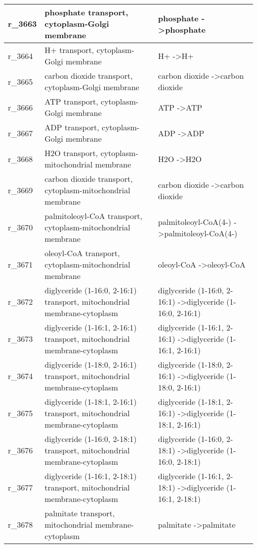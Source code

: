 \begin{landscape}
{\begin{longtable}{|l|p{7cm}|p{15cm}|}
r\_3663 & phosphate transport, cytoplasm-Golgi membrane & phosphate  -\textgreater phosphate \\ \hline
r\_3664 & H+ transport, cytoplasm-Golgi membrane & H+  -\textgreater H+ \\ \hline
r\_3665 & carbon dioxide transport, cytoplasm-Golgi membrane & carbon dioxide  -\textgreater carbon dioxide \\ \hline
r\_3666 & ATP transport, cytoplasm-Golgi membrane & ATP  -\textgreater ATP \\ \hline
r\_3667 & ADP transport, cytoplasm-Golgi membrane & ADP  -\textgreater ADP \\ \hline
r\_3668 & H2O transport, cytoplasm-mitochondrial membrane & H2O  -\textgreater H2O \\ \hline
r\_3669 & carbon dioxide transport, cytoplasm-mitochondrial membrane & carbon dioxide  -\textgreater carbon dioxide \\ \hline
r\_3670 & palmitoleoyl-CoA transport, cytoplasm-mitochondrial membrane & palmitoleoyl-CoA(4-)  -\textgreater palmitoleoyl-CoA(4-) \\ \hline
r\_3671 & oleoyl-CoA transport, cytoplasm-mitochondrial membrane & oleoyl-CoA  -\textgreater oleoyl-CoA \\ \hline
r\_3672 & diglyceride (1-16:0, 2-16:1) transport, mitochondrial membrane-cytoplasm & diglyceride (1-16:0, 2-16:1)  -\textgreater diglyceride (1-16:0, 2-16:1) \\ \hline
r\_3673 & diglyceride (1-16:1, 2-16:1) transport, mitochondrial membrane-cytoplasm & diglyceride (1-16:1, 2-16:1)  -\textgreater diglyceride (1-16:1, 2-16:1) \\ \hline
r\_3674 & diglyceride (1-18:0, 2-16:1) transport, mitochondrial membrane-cytoplasm & diglyceride (1-18:0, 2-16:1)  -\textgreater diglyceride (1-18:0, 2-16:1) \\ \hline
r\_3675 & diglyceride (1-18:1, 2-16:1) transport, mitochondrial membrane-cytoplasm & diglyceride (1-18:1, 2-16:1)  -\textgreater diglyceride (1-18:1, 2-16:1) \\ \hline
r\_3676 & diglyceride (1-16:0, 2-18:1) transport, mitochondrial membrane-cytoplasm & diglyceride (1-16:0, 2-18:1)  -\textgreater diglyceride (1-16:0, 2-18:1) \\ \hline
r\_3677 & diglyceride (1-16:1, 2-18:1) transport, mitochondrial membrane-cytoplasm & diglyceride (1-16:1, 2-18:1)  -\textgreater diglyceride (1-16:1, 2-18:1) \\ \hline
r\_3678 & palmitate transport, mitochondrial membrane-cytoplasm & palmitate  -\textgreater palmitate \\ \hline

\end{longtable}}
\end{landscape}

